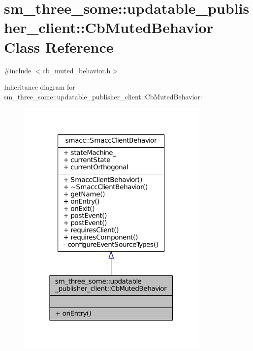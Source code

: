 \hypertarget{classsm__three__some_1_1updatable__publisher__client_1_1CbMutedBehavior}{}\section{sm\+\_\+three\+\_\+some\+:\+:updatable\+\_\+publisher\+\_\+client\+:\+:Cb\+Muted\+Behavior Class Reference}
\label{classsm__three__some_1_1updatable__publisher__client_1_1CbMutedBehavior}


{\ttfamily \#include $<$cb\+\_\+muted\+\_\+behavior.\+h$>$}



Inheritance diagram for sm\+\_\+three\+\_\+some\+:\+:updatable\+\_\+publisher\+\_\+client\+:\+:Cb\+Muted\+Behavior\+:
\nopagebreak
\begin{figure}[H]
\begin{center}
\leavevmode
\includegraphics[width=267pt]{classsm__three__some_1_1updatable__publisher__client_1_1CbMutedBehavior__inherit__graph}
\end{center}
\end{figure}


